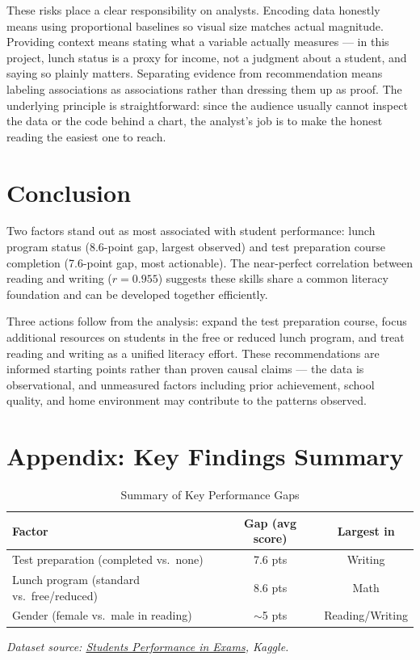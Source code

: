 \documentclass[12pt, letterpaper]{article}
\begin{document}
These risks place a clear responsibility on analysts. Encoding data honestly means using proportional baselines so visual size matches actual magnitude. Providing context means stating what a variable actually measures --- in this project, lunch status is a proxy for income, not a judgment about a student, and saying so plainly matters. Separating evidence from recommendation means labeling associations as associations rather than dressing them up as proof. The underlying principle is straightforward: since the audience usually cannot inspect the data or the code behind a chart, the analyst's job is to make the honest reading the easiest one to reach.

\section{Conclusion}

Two factors stand out as most associated with student performance: lunch program status (8.6-point gap, largest observed) and test preparation course completion (7.6-point gap, most actionable). The near-perfect correlation between reading and writing ($r = 0.955$) suggests these skills share a common literacy foundation and can be developed together efficiently.

Three actions follow from the analysis: expand the test preparation course, focus additional resources on students in the free or reduced lunch program, and treat reading and writing as a unified literacy effort. These recommendations are informed starting points rather than proven causal claims --- the data is observational, and unmeasured factors including prior achievement, school quality, and home environment may contribute to the patterns observed.

\section*{Appendix: Key Findings Summary}

\begin{table}[H]
\centering
\caption{Summary of Key Performance Gaps}
\begin{tabular}{lcc}
\toprule
\textbf{Factor} & \textbf{Gap (avg score)} & \textbf{Largest in} \\
\midrule
Test preparation (completed vs.\ none) & 7.6 pts & Writing \\
Lunch program (standard vs.\ free/reduced) & 8.6 pts & Math \\
Gender (female vs.\ male in reading) & $\sim$5 pts & Reading/Writing \\
\bottomrule
\end{tabular}
\end{table}

\vspace{2em}
\noindent\textit{Dataset source: \href{https://www.kaggle.com/datasets/spscientist/students-performance-in-exams}{Students Performance in Exams}, Kaggle.}
\end{document}
